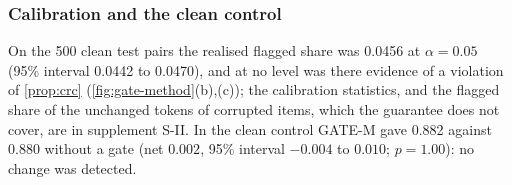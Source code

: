 \subsubsection{Calibration and the clean control}
On the 500 clean test pairs the realised flagged share was 0.0456 at $\alpha=0.05$ (95\% interval 0.0442 to 0.0470), and at no level
was there evidence of a violation of \cref{prop:crc} (\cref{fig:gate-method}(b),(c)); the calibration statistics, and the flagged share of
the unchanged tokens of corrupted items, which the guarantee does not cover, are in supplement S-II.
In the clean control GATE-M gave 0.882 against 0.880 without a gate (net $0.002$, 95\% interval $-0.004$ to $0.010$; $p=1.00$): no change
was detected.

